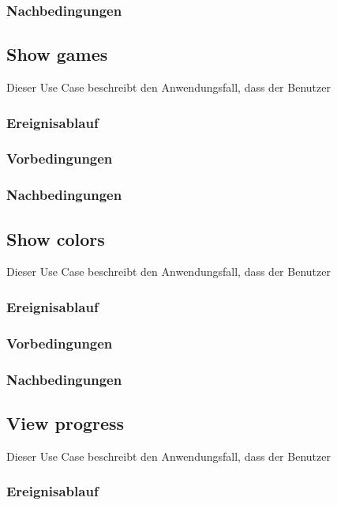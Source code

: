 		\subsubsection{Nachbedingungen}
	
	\subsection{Show games}
		Dieser Use Case beschreibt den Anwendungsfall, dass der Benutzer 
			
		\subsubsection{Ereignisablauf}

		\subsubsection{Vorbedingungen}
			
		\subsubsection{Nachbedingungen}
	
	\subsection{Show colors}
		Dieser Use Case beschreibt den Anwendungsfall, dass der Benutzer 
			
		\subsubsection{Ereignisablauf}

		\subsubsection{Vorbedingungen}
			
		\subsubsection{Nachbedingungen}
	
	\subsection{View progress}
		Dieser Use Case beschreibt den Anwendungsfall, dass der Benutzer 
			
		\subsubsection{Ereignisablauf}
	
